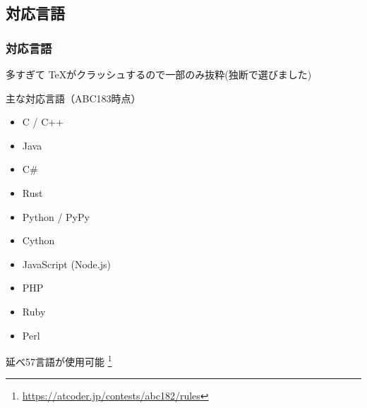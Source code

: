 \documentclass[t, aspectratio=169, dvipdfmx]{beamer}
\begin{document}
\subsection{対応言語}
\begin{frame}
  \frametitle{対応言語}
  多すぎて \TeX がクラッシュするので一部のみ抜粋(独断で選びました)
  \begin{block}{主な対応言語（ABC183時点）}
    \begin{multicols}{2}
      \begin{itemize}
        \item C / C++
        \item Java
        \item C\#
        \item Rust
        \item Python / PyPy
        \item Cython
        \item JavaScript (Node.js)
        \item PHP
        \item Ruby
        \item Perl
      \end{itemize}
    \end{multicols}
    延べ57言語が使用可能
    \footnote{\url{https://atcoder.jp/contests/abc182/rules}}
  \end{block}
\end{frame}
\end{document}
